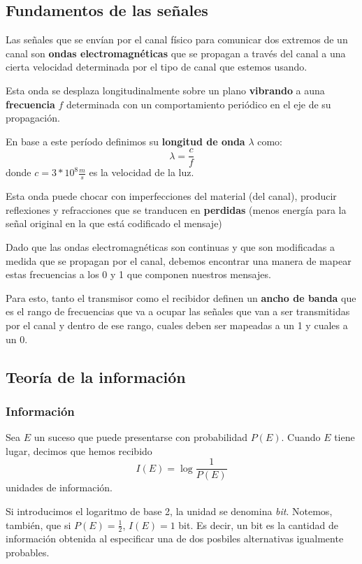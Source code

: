\documentclass[10pt,a4paper]{article}
\begin{document}
\subsection{Fundamentos de las señales}
Las señales que se envían por el canal físico para comunicar dos extremos de un canal son \textbf{ondas electromagnéticas} que se propagan a través del canal a una cierta velocidad determinada por el tipo de canal que estemos usando.

Esta onda se desplaza longitudinalmente sobre un plano \textbf{vibrando} a auna \textbf{frecuencia} \(f\) determinada con un comportamiento periódico en el eje de su propagación.

En base a este período definimos su \textbf{longitud de onda} \(\lambda\) como:
\[\lambda = \frac{c}{f}\] donde \(c=3*10^8\frac{m}{s}\) es la velocidad de la luz.

Esta onda puede chocar con imperfecciones del material (del canal), producir reflexiones y refracciones que se tranducen en \textbf{perdidas} (menos energía para la señal original en la que está codificado el mensaje)

Dado que las ondas electromagnéticas son continuas y que son modificadas a medida que se propagan por el canal, debemos encontrar una manera de mapear estas frecuencias a los 0 y 1 que componen nuestros mensajes.

Para esto, tanto el transmisor como el recibidor definen un \textbf{ancho de banda} que es el rango de frecuencias que va a ocupar las señales que van a ser transmitidas por el canal y dentro de ese rango, cuales deben ser mapeadas a un 1 y cuales a un 0.

\subsection{Teoría de la información}
\subsubsection{Información}
Sea \(E\) un suceso que puede presentarse con probabilidad \(P(E)\). Cuando \(E\) tiene lugar, decimos que hemos recibido \[I(E)=\log\frac
{1}{P(E)}\] unidades de información.

Si introducimos el logaritmo de base 2, la unidad se denomina \textit{bit}. Notemos, también, que si \(P(E) = \frac{1}{2}\), \(I(E) = 1\) bit. Es decir, un bit es la cantidad de información obtenida al especificar una de dos posbiles alternativas igualmente probables.
\end{document}
